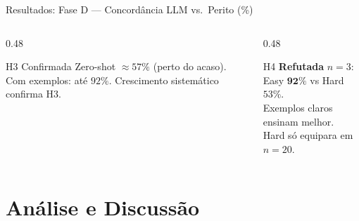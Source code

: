 \documentclass[aspectratio=169, 8pt]{beamer}
\begin{document}
\begin{frame}{Resultados: Fase D --- Concordância LLM vs.\ Perito (\%)}
  \begin{columns}[T]
    \begin{column}{0.48\textwidth}
      \begin{exampleblock}{\footnotesize H3 Confirmada}
        \footnotesize
        Zero-shot $\approx 57\%$ (perto do acaso).
        Com exemplos: até $92\%$.
        Crescimento sistemático confirma H3.
      \end{exampleblock}
    \end{column}
    \begin{column}{0.48\textwidth}
      \begin{alertblock}{\footnotesize H4 \textbf{Refutada}}
        \footnotesize
        $n=3$: Easy $\mathbf{92\%}$ vs Hard $53\%$.\\
        Exemplos claros ensinam melhor.\\
        Hard só equipara em $n=20$.
      \end{alertblock}
    \end{column}
  \end{columns}
\end{frame}

\section{Análise e Discussão}
\end{document}
